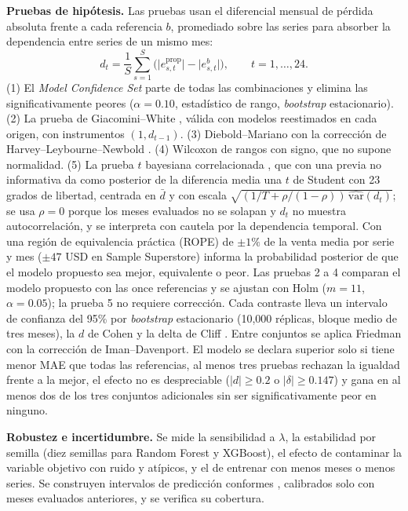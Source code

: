 \documentclass[pdflatex,sn-mathphys-num]{sn-jnl}
\theoremstyle{thmstyleone}
\begin{document}
\textbf{Pruebas de hipótesis.} Las pruebas usan el diferencial mensual de pérdida absoluta frente a cada referencia $b$, promediado sobre las series para absorber la dependencia entre series de un mismo mes:
\begin{equation}
d_t=\frac{1}{S}\sum_{s=1}^{S}\bigl(\lvert e^{\mathrm{prop}}_{s,t}\rvert-\lvert e^{b}_{s,t}\rvert\bigr),\qquad t=1,\dots,24.
\label{eq:dt}
\end{equation}
(1) El \emph{Model Confidence Set} \cite{hansen2011} parte de todas las combinaciones y elimina las significativamente peores ($\alpha=0.10$, estadístico de rango, \emph{bootstrap} estacionario). (2) La prueba de Giacomini--White \cite{giacomini2006}, válida con modelos reestimados en cada origen, con instrumentos $(1,d_{t-1})$. (3) Diebold--Mariano \cite{diebold1995} con la corrección de Harvey--Leybourne--Newbold \cite{harvey1997}. (4) Wilcoxon de rangos con signo, que no supone normalidad. (5) La prueba $t$ bayesiana correlacionada \cite{corani2015,benavoli2017}, que con una previa no informativa da como posterior de la diferencia media una $t$ de Student con 23 grados de libertad, centrada en $\bar{d}$ y con escala $\sqrt{(1/T+\rho/(1-\rho))\,\widehat{\mathrm{var}}(d_t)}$; se usa $\rho=0$ porque los meses evaluados no se solapan y $d_t$ no muestra autocorrelación, y se interpreta con cautela por la dependencia temporal. Con una región de equivalencia práctica (ROPE) de $\pm1\%$ de la venta media por serie y mes ($\pm47$ USD en Sample Superstore) informa la probabilidad posterior de que el modelo propuesto sea mejor, equivalente o peor. Las pruebas 2 a 4 comparan el modelo propuesto con las once referencias y se ajustan con Holm \cite{holm1979} ($m=11$, $\alpha=0.05$); la prueba 5 no requiere corrección. Cada contraste lleva un intervalo de confianza del 95\% por \emph{bootstrap} estacionario \cite{politis1994} (10{,}000 réplicas, bloque medio de tres meses), la $d$ de Cohen y la delta de Cliff \cite{cliff1993}. Entre conjuntos se aplica Friedman con la corrección de Iman--Davenport. El modelo se declara superior solo si tiene menor MAE que todas las referencias, al menos tres pruebas rechazan la igualdad frente a la mejor, el efecto no es despreciable ($|d|\ge0.2$ o $|\delta|\ge0.147$) y gana en al menos dos de los tres conjuntos adicionales sin ser significativamente peor en ninguno.

\textbf{Robustez e incertidumbre.} Se mide la sensibilidad a $\lambda$, la estabilidad por semilla (diez semillas para Random Forest y XGBoost), el efecto de contaminar la variable objetivo con ruido y atípicos, y el de entrenar con menos meses o menos series. Se construyen intervalos de predicción conformes \cite{angelopoulos2023}, calibrados solo con meses evaluados anteriores, y se verifica su cobertura.
\end{document}
